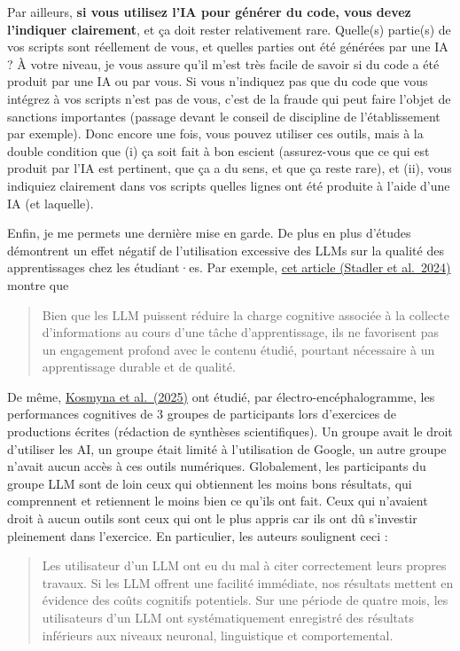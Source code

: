 \documentclass[
  french,
  a4paper,
  DIV=11,
  numbers=noendperiod,
  oneside]{scrreprt}
\begin{document}
Par ailleurs, \textbf{si vous utilisez l'IA pour générer du code, vous
devez l'indiquer clairement}, et ça doit rester relativement rare.
Quelle(s) partie(s) de vos scripts sont réellement de vous, et quelles
parties ont été générées par une IA ? À votre niveau, je vous assure
qu'il m'est très facile de savoir si du code a été produit par une IA ou
par vous. Si vous n'indiquez pas que du code que vous intégrez à vos
scripts n'est pas de vous, c'est de la fraude qui peut faire l'objet de
sanctions importantes (passage devant le conseil de discipline de
l'établissement par exemple). Donc encore une fois, vous pouvez utiliser
ces outils, mais à la double condition que (i) ça soit fait à bon
escient (assurez-vous que ce qui est produit par l'IA est pertinent, que
ça a du sens, et que ça reste rare), et (ii), vous indiquiez clairement
dans vos scripts quelles lignes ont été produite à l'aide d'une IA (et
laquelle).

Enfin, je me permets une dernière mise en garde. De plus en plus
d'études démontrent un effet négatif de l'utilisation excessive des LLMs
sur la qualité des apprentissages chez les étudiant·es. Par exemple,
\href{https://www.sciencedirect.com/science/article/pii/S0747563224002541}{cet
article (Stadler et al.~2024)} montre que

\begin{quote}
Bien que les LLM puissent réduire la charge cognitive associée à la
collecte d'informations au cours d'une tâche d'apprentissage, ils ne
favorisent pas un engagement profond avec le contenu étudié, pourtant
nécessaire à un apprentissage durable et de qualité.
\end{quote}

De même, \href{https://arxiv.org/abs/2506.08872}{Kosmyna et al.~(2025)}
ont étudié, par électro-encéphalogramme, les performances cognitives de
3 groupes de participants lors d'exercices de productions écrites
(rédaction de synthèses scientifiques). Un groupe avait le droit
d'utiliser les AI, un groupe était limité à l'utilisation de Google, un
autre groupe n'avait aucun accès à ces outils numériques. Globalement,
les participants du groupe LLM sont de loin ceux qui obtiennent les
moins bons résultats, qui comprennent et retiennent le moins bien ce
qu'ils ont fait. Ceux qui n'avaient droit à aucun outils sont ceux qui
ont le plus appris car ils ont dû s'investir pleinement dans l'exercice.
En particulier, les auteurs soulignent ceci :

\begin{quote}
Les utilisateur d'un LLM ont eu du mal à citer correctement leurs
propres travaux. Si les LLM offrent une facilité immédiate, nos
résultats mettent en évidence des coûts cognitifs potentiels. Sur une
période de quatre mois, les utilisateurs d'un LLM ont systématiquement
enregistré des résultats inférieurs aux niveaux neuronal, linguistique
et comportemental.
\end{quote}
\end{document}
